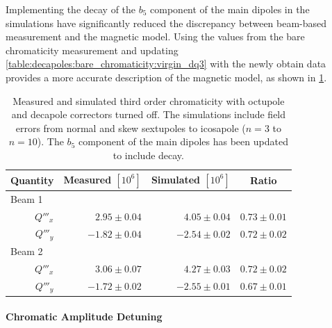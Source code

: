 Implementing the decay of the $b_5$ component of the main dipoles in the simulations have
significantly reduced the discrepancy between beam-based measurement and the magnetic model.
%
Using the values from the bare chromaticity measurement and updating
\cref{table:decapoles:bare_chromaticity:virgin_dq3} with the newly obtain data provides a more
accurate description of the magnetic model, as shown in
\cref{table:decapoles:decay:virgin_dq3_recompare}.


\begin{table}[!htb]
    \centering
    \begin{tabular}{rrrr}
      \toprule
      Quantity     &  Measured $[10^6]$        &  Simulated $[10^{6}]$          &   \multicolumn{1}{c}{Ratio}     \\
      \midrule
        \multicolumn{1}{l}{Beam 1}    &                             &                                &             \\
                $Q'''_x$ &       $ 2.95 \pm 0.04$      & $ 4.05 \pm 0.04$               &  $0.73 \pm 0.01$  \\
                $Q'''_y$ &       $-1.82 \pm 0.04$      & $-2.54 \pm 0.02$               &  $0.72 \pm 0.02$  \\
        \multicolumn{1}{l}{Beam 2}    &                             &                                &             \\
                $Q'''_x$ &       $ 3.06 \pm 0.07$      & $ 4.27 \pm 0.03$               &  $0.72 \pm 0.02$  \\
                $Q'''_y$ &       $-1.72 \pm 0.02$      & $-2.55 \pm 0.01$               &  $0.67 \pm 0.01$ \\
      \bottomrule
    \end{tabular}
    \caption{Measured and simulated third order chromaticity with octupole and decapole correctors
    turned off. The simulations include field errors from normal and skew sextupoles to icosapole
    ($n=3$ to $n=10$). The $b_5$ component of the main dipoles has been updated to include decay.}
    \label{table:decapoles:decay:virgin_dq3_recompare}
\end{table}




\paragraph{Chromatic Amplitude Detuning}

